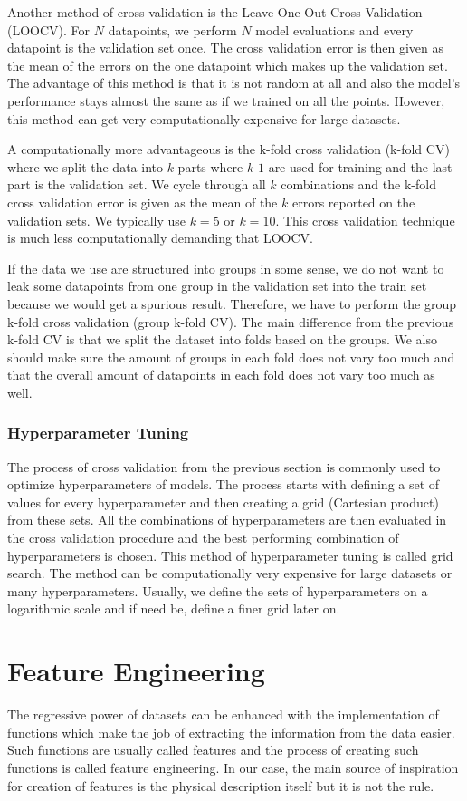 \documentclass[11pt,oneside,czech,american]{book} %
\theoremstyle{plain}
\theoremstyle{definition}
\begin{document}
Another method of cross validation is the Leave One Out Cross Validation (LOOCV). For $N$ datapoints, we perform $N$ model evaluations and every datapoint is the validation set once. The cross validation error is then given as the mean of the errors on the one datapoint which makes up the validation set. The advantage of this method is that it is not random at all and also the model's performance stays almost the same as if we trained on all the points. However, this method can get very computationally expensive for large datasets. 

A computationally more advantageous is the k-fold cross validation (k-fold CV) where we split the data into $k$ parts where $k$-$1$ are used for training and the last part is the validation set. We cycle through all $k$ combinations and the k-fold cross validation error is given as the mean of the $k$ errors reported on the validation sets. We typically use $k = 5$ or $k = 10$. This cross validation technique is much less computationally demanding that LOOCV.

If the data we use are structured into groups in some sense, we do not want to leak some datapoints from one group in the validation set into the train set because we would get a spurious result. Therefore, we have to perform the group k-fold cross validation (group k-fold CV). The main difference from the previous k-fold CV is that we split the dataset into folds based on the groups. We also should make sure the amount of groups in each fold does not vary too much and that the overall amount of datapoints in each fold does not vary too much as well.

\subsection{Hyperparameter Tuning}
The process of cross validation from the previous section is commonly used to optimize hyperparameters of models. The process starts with defining a set of values for every hyperparameter and then creating a grid (Cartesian product) from these sets. All the combinations of hyperparameters are then evaluated in the cross validation procedure and the best performing combination of hyperparameters is chosen. This method of hyperparameter tuning is called grid search. The method can be computationally very expensive for large datasets or many hyperparameters. Usually, we define the sets of hyperparameters on a logarithmic scale and if need be, define a finer grid later on.

\chapter{Feature Engineering}\label{feature_engineering}
The regressive power of datasets can be enhanced with the implementation of functions which make the job of extracting the information from the data easier. Such functions are usually called features and the process of creating such functions is called feature engineering. In our case, the main source of inspiration for creation of features is the physical description itself but it is not the rule.
\end{document}
